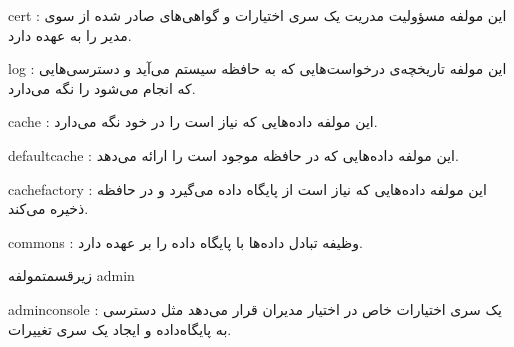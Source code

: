 

\begin{itemize}



 cert : این مولفه مسؤولیت مدریت یک سری اختیارات و گواهی‌های صادر شده از سوی مدیر را به عهده دارد.

 log :  این مولفه تاریخچه‌ی درخواست‌هایی که به حافظه سیستم می‌آید و دسترسی‌هایی که انجام می‌شود را نگه می‌دارد.

 cache : این مولفه داده‌هایی که نیاز است را در خود نگه می‌دارد.

 defaultcache : این مولفه داده‌هایی که در حافظه موجود است را ارائه می‌د‌هد.

 cachefactory : این مولفه داده‌هایی که نیاز است از پایگاه داده می‌گیرد و در حافظه ذخیره می‌کند.

 commons : وظیفه تبادل داده‌ها با پایگاه داده را بر عهده دارد.



\end{itemize}



زیرقسمت{مولفه admin}



\begin{itemize}

	

	 adminconsole : یک سری اختیارات خاص در اختیار مدیران قرار می‌دهد مثل دسترسی به پایگاه‌داده و ایجاد یک سری تغییرات.



\end{itemize}






